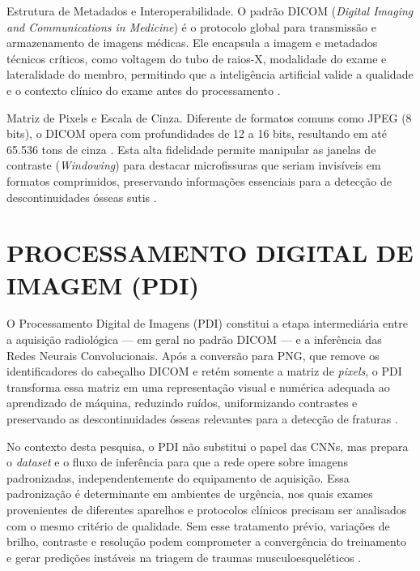 \documentclass[12pt,oneside,a4paper,chapter=TITLE,section=TITLE,sumario=tradicional]{abntex2}
\begin{document}
\begin{lista}
    \item Estrutura de Metadados e Interoperabilidade. O padrão DICOM (\textit{Digital Imaging and Communications in Medicine}) é o protocolo global para transmissão e armazenamento de imagens médicas. Ele encapsula a imagem e metadados técnicos críticos, como voltagem do tubo de raios-X, modalidade do exame e lateralidade do membro, permitindo que a inteligência artificial valide a qualidade e o contexto clínico do exame antes do processamento \cite{dicomstandard2024,smith2021}.
    \item Matriz de Pixels e Escala de Cinza. Diferente de formatos comuns como JPEG (8 bits), o DICOM opera com profundidades de 12 a 16 bits, resultando em até 65.536 tons de cinza \cite{dicomstandard2024}. Esta alta fidelidade permite manipular as janelas de contraste (\textit{Windowing}) para destacar microfissuras que seriam invisíveis em formatos comprimidos, preservando informações essenciais para a detecção de descontinuidades ósseas sutis \cite{litjens2017survey}.
\end{lista}

\section{PROCESSAMENTO DIGITAL DE IMAGEM (PDI)}

O Processamento Digital de Imagens (PDI) constitui a etapa intermediária entre a aquisição radiológica --- em geral no padrão DICOM --- e a inferência das Redes Neurais Convolucionais. Após a conversão para PNG, que remove os identificadores do cabeçalho DICOM e retém somente a matriz de \textit{pixels}, o PDI transforma essa matriz em uma representação visual e numérica adequada ao aprendizado de máquina, reduzindo ruídos, uniformizando contrastes e preservando as descontinuidades ósseas relevantes para a detecção de fraturas \cite{litjens2017survey,zuiderveld1994clahe}.

No contexto desta pesquisa, o PDI não substitui o papel das CNNs, mas prepara o \textit{dataset} e o fluxo de inferência para que a rede opere sobre imagens padronizadas, independentemente do equipamento de aquisição. Essa padronização é determinante em ambientes de urgência, nos quais exames provenientes de diferentes aparelhos e protocolos clínicos precisam ser analisados com o mesmo critério de qualidade. Sem esse tratamento prévio, variações de brilho, contraste e resolução podem comprometer a convergência do treinamento e gerar predições instáveis na triagem de traumas musculoesqueléticos \cite{kim2020,zhou2020}.
\end{document}
